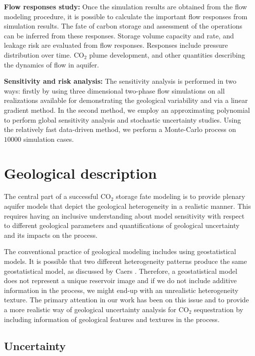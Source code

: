 \textbf{Flow responses study:} Once the simulation results are obtained from the
flow modeling procedure, it is possible to calculate the important flow
responses from simulation results. The fate of carbon storage and assessment of
the operations can be inferred from these responses. Storage volume capacity and
rate, and leakage risk are evaluated from flow responses. Responses include
pressure distribution over time. $\mbox{CO}_2$ plume development, and other
quantities describing the dynamics of flow in aquifer. 


\textbf{Sensitivity and risk analysis:} The sensitivity analysis is performed
in two ways: firstly by using three dimensional two-phase flow simulations on
all realizations available for demonstrating the geological variability and via
a linear gradient method. In the second method, we employ an
approximating polynomial to perform global sensitivity analysis and
stochastic uncertainty studies. Using  the relatively fast data-driven method,
we perform a Monte-Carlo process on $10000$ simulation cases. 

\section{Geological description}
\label{sec:GeologicalDescription}


The central part of a successful $\mbox{CO}_2$ storage fate modeling is to
provide plenary aquifer models that depict the geological heterogeneity in a
realistic manner. This requires having an inclusive understanding about model
sensitivity with respect to different geological parameters and quantifications
of geological uncertainty and its impacts on the process. 

The conventional practice of geological modeling includes using geostatistical
models. It is possible that two different heterogeneity patterns produce the
same geostatistical model, as discussed by Caers \cite{caers2002multiple}.
Therefore, a geostatistical model does not represent a unique reservoir image
and if we do not include additive information in the process, we might end-up
with an unrealistic heterogeneity
texture\cite{caers2002multiple,eaton2006importance}. The primary  attention in
our work has been on this issue and to provide a more realistic way of
geological uncertainty analysis for $\mbox{CO}_2$ sequestration by including
information of geological features and textures in the process. 

\subsection{Uncertainty}

